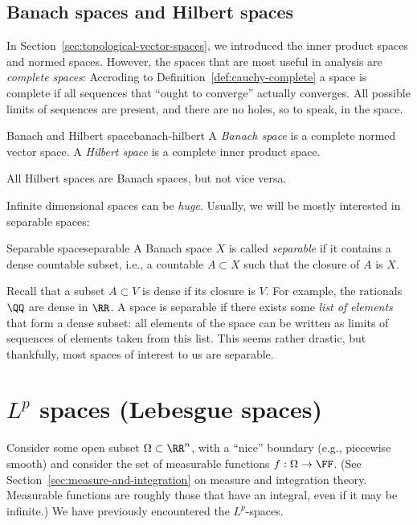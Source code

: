 \subsection{Banach spaces and Hilbert spaces}

In Section~\ref{sec:topological-vector-spaces}, we introduced the inner product spaces and normed spaces. However, the spaces that are most useful in analysis are \emph{complete spaces}: Accroding to Definition~\ref{def:cauchy-complete} a space is complete if all sequences that ``ought to converge'' actually converges. All possible limits of sequences are present, and there are no holes, so to speak, in the space.

\begin{myDefinition}{Banach and Hilbert space}{banach-hilbert}
    A \emph{Banach space} is a complete normed vector space. A \emph{Hilbert space} is a complete inner product space.
\end{myDefinition}
All Hilbert spaces are Banach spaces, but not vice versa.


Infinite dimensional spaces can be \emph{huge}. Usually, we will be mostly interested in separable spaces:
\begin{myDefinition}{Separable space}{separable}
A Banach space $X$ is called \emph{separable} if it contains a dense countable subset, i.e., a countable $A \subset X$ such that the closure of $A$ is $X$. 
\end{myDefinition}


Recall that a subset $A\subset V$ is dense if its closure is $V$. For example, the rationals $\QQ$ are dense in $\RR$. A space is separable if there exists some \emph{list of elements} that form a dense subset: all elements of the space can be written as limits of sequences of elements taken from this list. This seems rather drastic, but thankfully, most spaces of interest to us are separable.


\section{$L^p$ spaces (Lebesgue spaces)}


Consider some open subset $\Omega \subset \RR^n$, with a ``nice'' boundary (e.g., piecewise smooth) and consider the set of measurable functions $f : \Omega \to \FF$. (See Section~\ref{sec:measure-and-integration} on measure and integration theory. Measurable functions are roughly those that have an integral, even if it may be infinite.) We have previously encountered the $L^p$-spaces.

